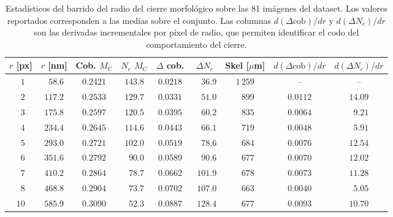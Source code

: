 \begin{table}[H]
\centering
\caption{Estadísticos del barrido del radio del cierre morfológico sobre las 81 imágenes del dataset. Los valores reportados corresponden a las medias sobre el conjunto. Las columnas $d(\Delta\text{cob})/dr$ y $d(\Delta N_c)/dr$ son las derivadas incrementales por píxel de radio, que permiten identificar el codo del comportamiento del cierre.}
\label{tab:barrido_radio}
\small
\begin{tabular}{ccccccccc}
\toprule
\textbf{$r$ [px]} & \textbf{$r$ [nm]} & \textbf{Cob. $M_{\mathrm{C}}$} & \textbf{$N_c$ $M_{\mathrm{C}}$} & \textbf{$\Delta$ cob.} & \textbf{$\Delta N_c$} & \textbf{Skel [$\mu$m]} & \textbf{$d(\Delta\text{cob})/dr$} & \textbf{$d(\Delta N_c)/dr$} \\
\midrule
$\phantom{0}1$ & $\phantom{0}58.6$ & $0.2421$ & $143.8$ & $0.0218$ & $\phantom{00}36.9$ & $1\,259$           & --       & --       \\
$\phantom{0}2$ & $117.2$           & $0.2533$ & $129.7$ & $0.0331$ & $\phantom{00}51.0$ & $\phantom{0\,}899$ & $0.0112$ & $14.09$  \\
$\phantom{0}3$ & $175.8$           & $0.2597$ & $120.5$ & $0.0395$ & $\phantom{00}60.2$ & $\phantom{0\,}835$ & $0.0064$ & $\phantom{0}9.21$  \\
$\phantom{0}4$ & $234.4$           & $0.2645$ & $114.6$ & $0.0443$ & $\phantom{00}66.1$ & $\phantom{0\,}719$ & $0.0048$ & $\phantom{0}5.91$  \\
$\phantom{0}5$ & $293.0$           & $0.2721$ & $102.0$ & $0.0519$ & $\phantom{00}78.6$ & $\phantom{0\,}684$ & $0.0076$ & $12.54$  \\
$\phantom{0}6$ & $351.6$           & $0.2792$ & $\phantom{0}90.0$  & $0.0589$ & $\phantom{00}90.6$ & $\phantom{0\,}677$ & $0.0070$ & $12.02$  \\
$\phantom{0}7$ & $410.2$           & $0.2864$ & $\phantom{0}78.7$  & $0.0662$ & $\phantom{0}101.9$ & $\phantom{0\,}678$ & $0.0073$ & $11.28$  \\
$\phantom{0}8$ & $468.8$           & $0.2904$ & $\phantom{0}73.7$  & $0.0702$ & $\phantom{0}107.0$ & $\phantom{0\,}663$ & $0.0040$ & $\phantom{0}5.05$  \\
$10$           & $585.9$           & $0.3090$ & $\phantom{0}52.3$  & $0.0887$ & $\phantom{0}128.4$ & $\phantom{0\,}677$ & $0.0093$ & $10.70$  \\
\bottomrule
\end{tabular}
\end{table}
 
